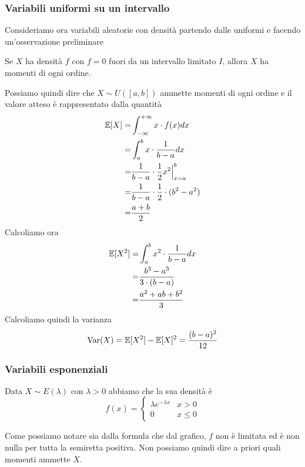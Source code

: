 \subsubsection{Variabili uniformi su un intervallo}
Consideriamo ora variabili aleatorie con densità partendo dalle uniformi e facendo un'osservazione
preliminare

\begin{observation}
	Se $X$ ha densità $f$ con $f = 0$ fuori da un intervallo limitato $I$, allora $X$ ha momenti
	di ogni ordine.
\end{observation}

Possiamo quindi dire che $X \sim U([a,b])$ ammette momenti di ogni ordine e il valore atteso è
rappresentato dalla quantità
\begin{align*}
	\mathbb{E}[X] = & \int_{-\infty}^{+\infty} x \cdot f (x) dx           \\
	=       & \int_a^b x \cdot \frac{1}{b-a} dx                   \\
	=       & \frac{1}{b - a} \cdot \frac{1}{2} x^2 \Big|_{x=a}^b \\
	=       & \frac{1}{b - a} \cdot \frac{1}{2} \cdot (b^2 - a^2) \\
	=       & \frac{a + b}{2}
\end{align*}
Calcoliamo ora
\begin{align*}
	\mathbb{E}[X^2] = & \int_a^b x^2 \cdot \frac{1}{b-a} dx \\
	=         & \frac{b^3 - a^3}{3 \cdot (b-a)}     \\
	=         & \frac{a^2 + ab + b^2}{3}
\end{align*}
Calcoliamo quindi la varianza
\[ \operatorname{Var}(X) = \mathbb{E}[X^2] - \mathbb{E}[X]^2 = \frac{(b - a)^2}{12} \]

\subsubsection{Variabili esponenziali}
Data $X \sim E(\lambda)$ con $\lambda > 0$ abbiamo che la sua densità è
\[
	f(x) = \begin{cases}
		\lambda e^{-\lambda x} & x > 0    \\
		0                      & x \leq 0
	\end{cases}
\]
\begin{center}
\end{center}
Come possiamo notare sia dalla formula che dal grafico, $f$ non è limitata ed è non nulla per tutta
la semiretta positiva. Non possiamo quindi dire a priori quali momenti ammette $X$.

